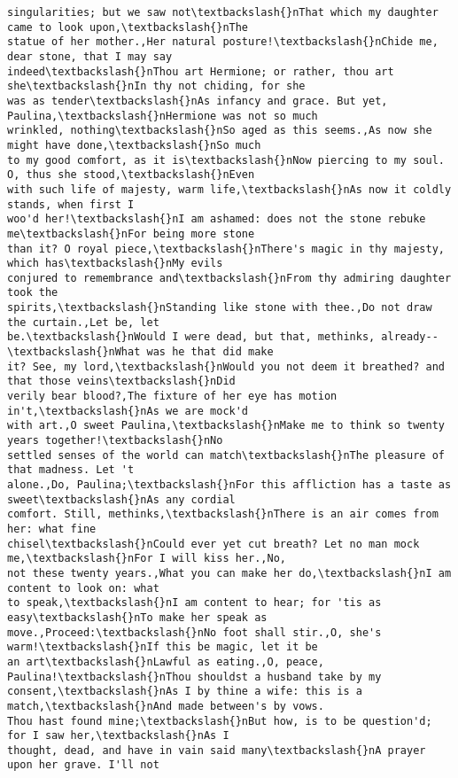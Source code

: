 \documentclass[11pt]{article}
\begin{document}
\begin{tcolorbox}[breakable, size=fbox, boxrule=.5pt, pad at break*=1mm, opacityfill=0]
\begin{Verbatim}[commandchars=\\\{\}]
singularities; but we saw not\textbackslash{}nThat which my daughter came to look upon,\textbackslash{}nThe
statue of her mother.,Her natural posture!\textbackslash{}nChide me, dear stone, that I may say
indeed\textbackslash{}nThou art Hermione; or rather, thou art she\textbackslash{}nIn thy not chiding, for she
was as tender\textbackslash{}nAs infancy and grace. But yet, Paulina,\textbackslash{}nHermione was not so much
wrinkled, nothing\textbackslash{}nSo aged as this seems.,As now she might have done,\textbackslash{}nSo much
to my good comfort, as it is\textbackslash{}nNow piercing to my soul. O, thus she stood,\textbackslash{}nEven
with such life of majesty, warm life,\textbackslash{}nAs now it coldly stands, when first I
woo'd her!\textbackslash{}nI am ashamed: does not the stone rebuke me\textbackslash{}nFor being more stone
than it? O royal piece,\textbackslash{}nThere's magic in thy majesty, which has\textbackslash{}nMy evils
conjured to remembrance and\textbackslash{}nFrom thy admiring daughter took the
spirits,\textbackslash{}nStanding like stone with thee.,Do not draw the curtain.,Let be, let
be.\textbackslash{}nWould I were dead, but that, methinks, already--\textbackslash{}nWhat was he that did make
it? See, my lord,\textbackslash{}nWould you not deem it breathed? and that those veins\textbackslash{}nDid
verily bear blood?,The fixture of her eye has motion in't,\textbackslash{}nAs we are mock'd
with art.,O sweet Paulina,\textbackslash{}nMake me to think so twenty years together!\textbackslash{}nNo
settled senses of the world can match\textbackslash{}nThe pleasure of that madness. Let 't
alone.,Do, Paulina;\textbackslash{}nFor this affliction has a taste as sweet\textbackslash{}nAs any cordial
comfort. Still, methinks,\textbackslash{}nThere is an air comes from her: what fine
chisel\textbackslash{}nCould ever yet cut breath? Let no man mock me,\textbackslash{}nFor I will kiss her.,No,
not these twenty years.,What you can make her do,\textbackslash{}nI am content to look on: what
to speak,\textbackslash{}nI am content to hear; for 'tis as easy\textbackslash{}nTo make her speak as
move.,Proceed:\textbackslash{}nNo foot shall stir.,O, she's warm!\textbackslash{}nIf this be magic, let it be
an art\textbackslash{}nLawful as eating.,O, peace, Paulina!\textbackslash{}nThou shouldst a husband take by my
consent,\textbackslash{}nAs I by thine a wife: this is a match,\textbackslash{}nAnd made between's by vows.
Thou hast found mine;\textbackslash{}nBut how, is to be question'd; for I saw her,\textbackslash{}nAs I
thought, dead, and have in vain said many\textbackslash{}nA prayer upon her grave. I'll not

\end{Verbatim}
\end{tcolorbox}
\end{document}
